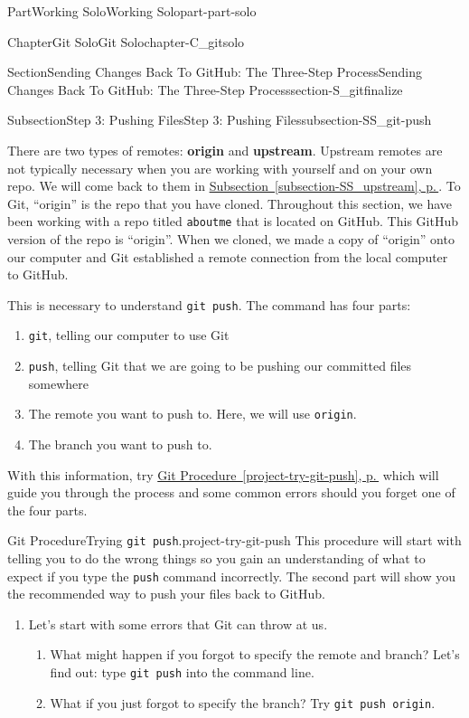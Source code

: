 \documentclass[twoside,10pt,]{book}
\newcommand{\xreffont}{\relax}
\newcommand{\mono}[1]{\texttt{#1}}
\newcommand{\terminology}[1]{\textbf{#1}}
\begin{document}
\begin{partptx}{Part}{Working Solo}{}{Working Solo}{}{}{part-part-solo}
\begin{chapterptx}{Chapter}{Git Solo}{}{Git Solo}{}{}{chapter-C_gitsolo}
\begin{sectionptx}{Section}{Sending Changes Back To GitHub: The Three-Step Process}{}{Sending Changes Back To GitHub: The Three-Step Process}{}{}{section-S_gitfinalize}
\begin{subsectionptx}{Subsection}{Step 3: Pushing Files}{}{Step 3: Pushing Files}{}{}{subsection-SS_git-push}
\par
There are two types of remotes: \terminology{origin} and \terminology{upstream}. Upstream remotes are not typically necessary when you are working with yourself and on your own repo. We will come back to them in \hyperref[subsection-SS_upstream]{Subsection~{\xreffont\ref{subsection-SS_upstream}}, p.\,\pageref{subsection-SS_upstream}}. To Git, ``origin'' is the repo that you have cloned. Throughout this section, we have been working with a repo titled \mono{aboutme} that is located on GitHub. This GitHub version of the repo is ``origin''. When we cloned, we made a copy of ``origin'' onto our computer and Git established a remote connection from the local computer to GitHub.%
\par
This is necessary to understand \mono{git push}. The command has four parts:%
\begin{enumerate}
\item{}\mono{git}, telling our computer to use Git%
\item{}\mono{push}, telling Git that we are going to be pushing our committed files somewhere%
\item{}The remote you want to push to. Here, we will use \mono{origin}.%
\item{}The branch you want to push to.%
\end{enumerate}
With this information, try \hyperref[project-try-git-push]{Git Procedure~{\xreffont\ref{project-try-git-push}}, p.\,\pageref{project-try-git-push}} which will guide you through the process and some common errors should you forget one of the four parts.%
\begin{project}{Git Procedure}{Trying \mono{git push}.}{project-try-git-push}%
This procedure will start with telling you to do the wrong things so you gain an understanding of what to expect if you type the \mono{push} command incorrectly. The second part will show you the recommended way to push your files back to GitHub.%
\begin{enumerate}[font=\bfseries,label=(\alph*),ref=\alph*]%
\item{}Let's start with some errors that Git can throw at us.%
\begin{enumerate}[font=\bfseries,label=(\roman*),ref=\theenumi.\roman*]%
\item{}What might happen if you forgot to specify the remote and branch? Let's find out: type \mono{git push} into the command line.%
\item{}What if you just forgot to specify the branch? Try \mono{git push origin}.%

\end{enumerate}
\end{enumerate}
\end{project}
\end{subsectionptx}
\end{sectionptx}
\end{chapterptx}
\end{partptx}
\end{document}
